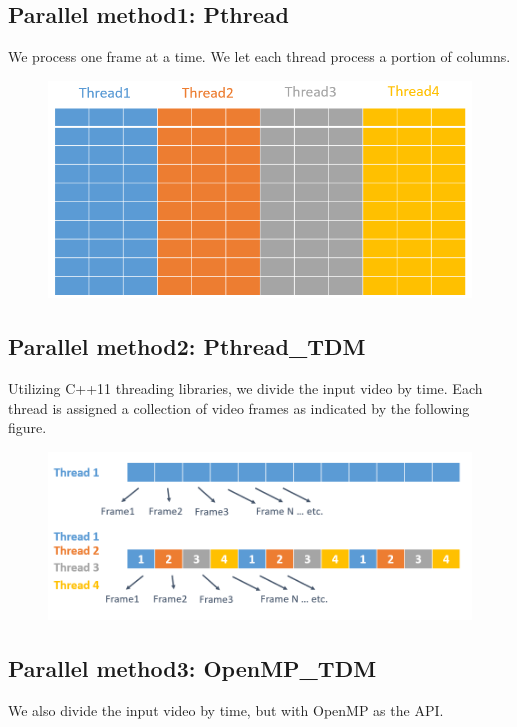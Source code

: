 \documentclass{acm_proc_article-sp}
\begin{document}
\subsection{Parallel method1: Pthread}
We process one frame at a time. We let each thread process a portion of columns.
\begin{figure}[H]
  \includegraphics[width=\linewidth,natwidth=789,natheight=405]{Pthread.png}
  \label{fig:TDM}
\end{figure}
\subsection{Parallel method2: Pthread\_TDM}
Utilizing C++11 threading libraries, we divide the input video by time. Each thread is assigned a collection of video frames as indicated by the following figure. \\
\begin{figure}[H]
  \includegraphics[width=\linewidth,natwidth=934,natheight=370]{TDM.png}
  \label{fig:TDM}
\end{figure}
\subsection{Parallel method3: OpenMP\_TDM}
We also divide the input video by time, but with OpenMP as the API.
\end{document}
